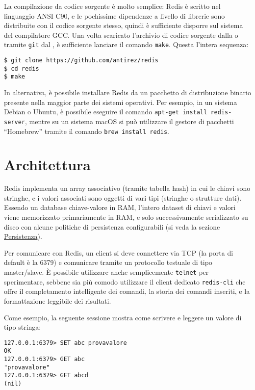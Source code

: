 La compilazione da codice sorgente è molto semplice: Redis è scritto nel linguaggio
ANSI C90, e le pochissime dipendenze a livello di librerie sono distribuite con il
codice sorgente stesso, quindi è sufficiente disporre sul sistema del compilatore GCC.
Una volta scaricato l'archivio di codice sorgente dalla \cite{pagina di scaricamento ufficiale}
o tramite \verb|git| dal \cite{repositorio ufficiale su GitHub}, è sufficiente lanciare il
comando \verb|make|. Questa l'intera sequenza:

\medskip
\begin{lstlisting}
$ git clone https://github.com/antirez/redis
$ cd redis
$ make
\end{lstlisting}

In alternativa, è possibile installare Redis da un pacchetto di distribuzione binario
presente nella maggior parte dei sistemi operativi. Per esempio, in un sistema Debian
o Ubuntu, è possibile eseguire il comando \verb|apt-get install redis-server|, mentre
su un sistema macOS si può utilizzare il gestore di pacchetti ``Homebrew'' tramite il
comando \verb|brew install redis|.

\section{Architettura}

Redis implementa un array associativo (tramite tabella hash) in cui le chiavi sono stringhe, e i
valori associati sono oggetti di vari tipi (stringhe o strutture dati). Essendo un database
chiave-valore in RAM, l'intero dataset di chiavi e valori viene memorizzato primariamente in RAM, e
solo successivamente serializzato su disco con alcune politiche di persistenza configurabili (si
veda la sezione \hyperref[sec:persistence]{Persistenza}).

Per comunicare con Redis, un client si deve connettere via TCP (la porta di default è la 6379) e
comunicare tramite un protocollo testuale di tipo master/slave. È possibile utilizzare
anche semplicemente \verb|telnet| per sperimentare, sebbene sia più comodo utilizzare il
client dedicato \verb|redis-cli| che offre il completamento intelligente dei comandi, la
storia dei comandi inseriti, e la formattazione leggibile dei risultati.

Come esempio, la seguente sessione mostra come scrivere e leggere un valore di tipo
stringa:

\medskip
\begin{lstlisting}
127.0.0.1:6379> SET abc provavalore
OK
127.0.0.1:6379> GET abc
"provavalore"
127.0.0.1:6379> GET abcd
(nil)
\end{lstlisting}

